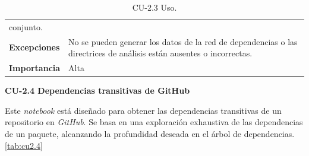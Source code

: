 \begin{table}[h!]
\begin{tabularx}{\linewidth}{ p{} p{} }
		conjunto.                                                                                                                                  \\
		\textbf{Excepciones}          & No se pueden generar los datos de la red de dependencias o las
		directrices de análisis están ausentes o incorrectas.                                                                                      \\
		\textbf{Importancia}          & Alta                                                                                                       \\
		\bottomrule
	\end{tabularx}
	\caption{CU-2.3 Uso.}
	\label{tab:cu2.3}
\end{table}

\textbf{CU-2.4 Dependencias transitivas de GitHub}

Este \textit{notebook} está diseñado para obtener las dependencias transitivas de un repositorio
en \textit{GitHub}. Se basa en una exploración exhaustiva de las dependencias de un paquete,
alcanzando la profundidad deseada en el árbol de dependencias.\ref{tab:cu2.4}

